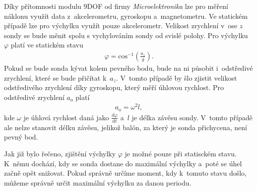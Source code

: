 \documentclass[twoside]{ctuthesis}
\newcommand{\diff}{\text{d}}
\theoremstyle{plain}
\theoremstyle{definition}
\theoremstyle{note}
\begin{document}
		Díky přítomnosti modulu 9DOF od firmy \textit{Microelektronika} lze pro měření náklonu využít data z~akcelerometru, gyroskopu a~magnetometru. Ve statickém případě lze pro výchylku využít pouze akcelerometr. Velikost zrychlení v~ose $z$ sondy se bude měnit spolu s vychylováním sondy od svislé polohy. Pro výchylku $\varphi$ platí ve statickém stavu
		\begin{align}
			\varphi = \text{cos}^{-1}\left(\frac{a_z}{g}\right).
		\end{align}
		Pokud se bude sonda kývat kolem pevného bodu, bude na ni působit i~odstředivé zrychlení, které se bude přičítat k~$a_z$. V~tomto případě by šlo zjistit velikost odstředivého zrychlení díky gyroskopu, který měří úhlovou rychlost. Pro odstředivé zrychlení $a_\text{o}$ platí
		\begin{align}
			a_\text{o} = \omega^2 l,
		\end{align}
		kde $\omega$ je úhlová rychlost daná jako $\frac{\diff \varphi}{\diff t}$ a~$l$ je délka závěsu sondy. V~tomto případě ale nelze stanovit délku závěsu, jelikož balón, za který je sonda přichycena, není pevný bod.

		Jak již bylo řečeno, zjištění výchylky $\varphi$ je možné pouze při statisckém stavu. K~němu dochází, kdy se sonda dostane do maximální výchylky a~poté se úhel začně opět snižovat. Pokud správně určíme moment, kdy k~tomuto stavu došlo, můžeme správně určit maximální výchylku za danou periodu. 
\end{document}

